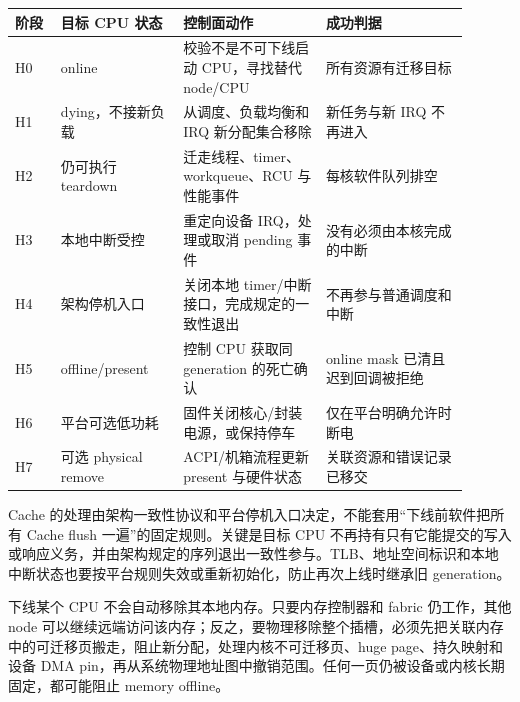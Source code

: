 \begin{longtable}{L{0.09\linewidth}L{0.24\linewidth}L{0.29\linewidth}L{0.28\linewidth}}
\toprule
阶段 & 目标 CPU 状态 & 控制面动作 & 成功判据 \\
\midrule
H0 & online & 校验不是不可下线启动 CPU，寻找替代 node/CPU & 所有资源有迁移目标 \\\tablerowrule
H1 & dying，不接新负载 & 从调度、负载均衡和 IRQ 新分配集合移除 & 新任务与新 IRQ 不再进入 \\\tablerowrule
H2 & 仍可执行 teardown & 迁走线程、timer、workqueue、RCU 与性能事件 & 每核软件队列排空 \\\tablerowrule
H3 & 本地中断受控 & 重定向设备 IRQ，处理或取消 pending 事件 & 没有必须由本核完成的中断 \\\tablerowrule
H4 & 架构停机入口 & 关闭本地 timer/中断接口，完成规定的一致性退出 & 不再参与普通调度和中断 \\\tablerowrule
H5 & offline/present & 控制 CPU 获取同 generation 的死亡确认 & online mask 已清且迟到回调被拒绝 \\\tablerowrule
H6 & 平台可选低功耗 & 固件关闭核心/封装电源，或保持停车 & 仅在平台明确允许时断电 \\\tablerowrule
H7 & 可选 physical remove & ACPI/机箱流程更新 present 与硬件状态 & 关联资源和错误记录已移交 \\
\bottomrule
\end{longtable}

Cache 的处理由架构一致性协议和平台停机入口决定，不能套用“下线前软件把所有 Cache flush 一遍”的固定规则。关键是目标 CPU 不再持有只有它能提交的写入或响应义务，并由架构规定的序列退出一致性参与。TLB、地址空间标识和本地中断状态也要按平台规则失效或重新初始化，防止再次上线时继承旧 generation。


下线某个 CPU 不会自动移除其本地内存。只要内存控制器和 fabric 仍工作，其他 node 可以继续远端访问该内存；反之，要物理移除整个插槽，必须先把关联内存中的可迁移页搬走，阻止新分配，处理内核不可迁移页、huge page、持久映射和设备 DMA pin，再从系统物理地址图中撤销范围。任何一页仍被设备或内核长期固定，都可能阻止 memory offline。

